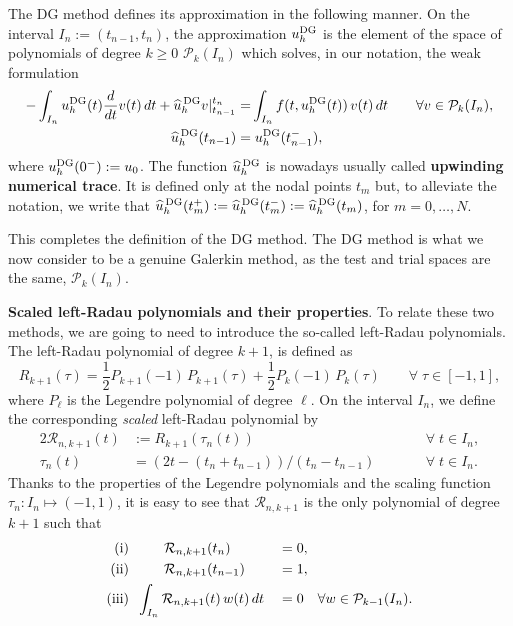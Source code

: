 \documentclass[bpam,reqno]{ipart}
\begin{document}
The DG method \cite{LesaintRaviart74,ReedHill73} defines its approximation in the following manner.
On the interval $I_n:=(t_{n-1},t_n)$, the approximation $u^{{\rm DG}}_h$ is the element of the space of polynomials of degree $k\ge0$ $\mathcal{P}_k(I_n)$ which solves, in our notation, the weak formulation
\begin{alignat*}{2}
-\int_{I_n} u^{{\rm DG}}_h (t) \frac{d}{dt} v(t)\,dt + \widehat{u}^{\,{\rm DG}}_h v |_{t_{n-1}}^{t_n}=&
\int_{I_n}  f(t,u^{{\rm DG}}_h(t)) \,v(t)\,dt &&\quad\forall v\in \mathcal{P}_k(I_n),
\\
{\widehat{u}^{\,{\rm DG}}_h(t_{n-1})}=&\;u^{{\rm DG}}_h(t_{n-1}^-),
\end{alignat*}
where $u^{{\rm DG}}_h(0^-):=u_0$. The function $\widehat{u}^{\,{\rm DG}}_h$ is nowadays usually called {\bf upwinding numerical trace}. { It is defined only at the nodal points $t_m$ but, to alleviate the notation, we
write that $\widehat{u}^{\,{\rm DG}}_h(t_m^+):=\widehat{u}^{\,{\rm DG}}_h(t_m^-):=\widehat{u}^{\,{\rm DG}}_h(t_m)$,  for $m=0,\dots,N$.}

{This completes the definition of the DG method. The DG method is what we now consider to be a genuine Galerkin method, as the test and trial spaces are the same, $\mathcal{P}_k(I_n)$.}

{\bf Scaled left-Radau polynomials and their properties}. To relate these two methods, we are going to need to introduce the so-called left-Radau polynomials. The left-Radau polynomial of degree $k+1$,
is defined as
\[
R_{k+1}(\tau) =\frac12 P_{k+1}(-1)\,P_{k+1}(\tau)
              +\frac12 P_{k}(-1)  \,P_{k}(\tau)
              \qquad\forall\;\tau\in [-1,1],
\]
where $P_\ell$ is the Legendre polynomial of degree $\ell$.
On the interval $I_n$, we define the corresponding {\em scaled} left-Radau polynomial by
\begin{alignat*}{2}
\mathcal{R}_{n,k+1}(t)&:=R_{k+1}(\tau_n(t))
&&\qquad \forall\;t\in I_n,
\\
\tau_n(t)&=(2t-(t_n+t_{n-1}))/(t_n-t_{n-1})
&&\qquad
\forall\;t\in I_n.
\end{alignat*}
Thanks to the properties of the Legendre polynomials and the scaling function $\tau_n: I_n\mapsto (-1,1)$, it is easy to see that
$\mathcal{R}_{n,k+1} $ is the only polynomial of degree $k+1$ such that
\begin{alignat*}{2}
 {\text{\rm(i)}}& \;\;\;\;\;\;\;\;\; \mathcal{R}_{n,k+1}(t_n)\;\;\;\;\;&&=0,
 \\
 {\text{\rm(ii)}}&  \;\;\;\;\;\;\;\;\;\mathcal{R}_{n,k+1}(t_{n-1})&&=1,
 \\
 {\text{\rm(iii)}}&  \;\;\int_{I_n}\mathcal{R}_{n,k+1}(t)\,w(t)\,dt&&=0 \quad\forall w\in \mathcal{P}_{k-1}(I_n).
 \end{alignat*}
\end{document}
